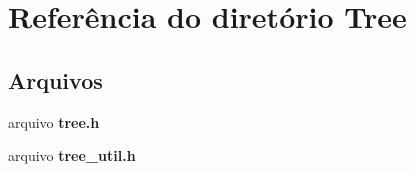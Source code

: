\section{Referência do diretório Tree}
\label{dir_f4f5623ecd70183c592bcb35d052af73}
\subsection*{Arquivos}
\begin{DoxyCompactItemize}
\item 
arquivo {\bf tree.\+h}
\item 
arquivo {\bf tree\+\_\+util.\+h}
\end{DoxyCompactItemize}
